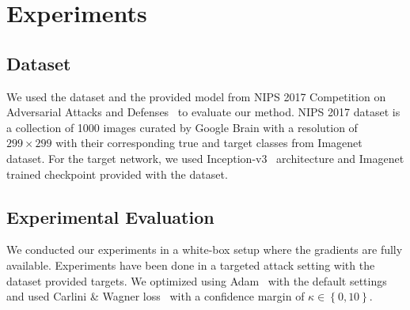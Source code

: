 \chapter{Experiments}
\label{chp:4_results}
\section{Dataset}

We used the dataset and the provided model from NIPS 2017 Competition on Adversarial Attacks and Defenses~\cite{kurakin2018adversarial} to evaluate our method. NIPS 2017 dataset is a collection of 1000 images curated by Google Brain with a resolution of \(299 \times 299\) with their corresponding true and target classes from Imagenet~\cite{deng2009imagenet} dataset. For the target network, we used Inception-v3~\cite{szegedy2016rethinking} architecture and Imagenet trained checkpoint provided with the dataset.
\section{Experimental Evaluation}
We conducted our experiments in a white-box setup where the gradients are fully available. Experiments have been done in a targeted attack setting with the dataset provided targets. We optimized using Adam~\cite{kingma2015adam} with the default settings and used Carlini \& Wagner loss~\cite{carlini2017towards} with a confidence margin of \(\kappa \in \left\{ 0, 10 \right\}\).


